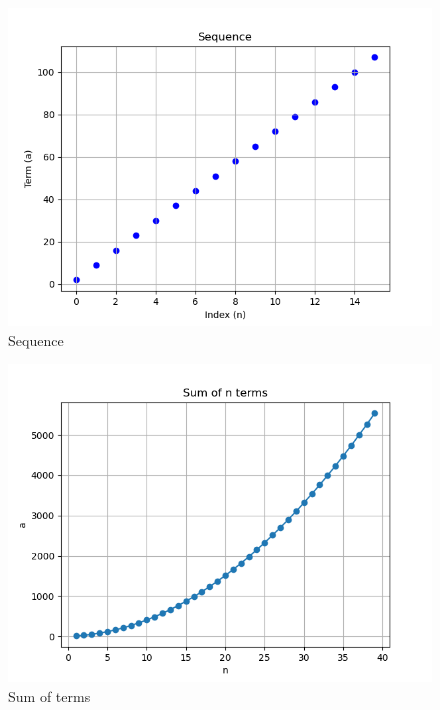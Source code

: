 \documentclass[journal,12pt,twocolumn]{IEEEtran}
\theoremstyle{remark}
\begin{document}
\begin{enumerate}
\begin{figure}[h]
\includegraphics[width=\columnwidth]{generalterm.png}

\begin{center}
    \caption{Sequence}
\end{center}
    
    \label{fig:Sound Wave}
\end{figure}


\begin{figure}[h]
    \centering  

\includegraphics[width=\columnwidth]{sumplot.png}

\begin{center}
    \caption{Sum of terms}
\end{center}
    
    \label{fig:}
\end{figure}


\end{enumerate}
\end{document}

